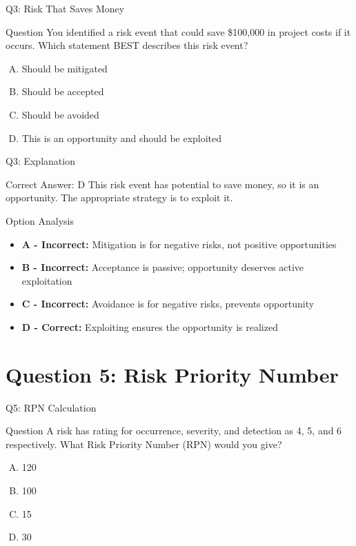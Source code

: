\documentclass{beamer}
\begin{document}
	\begin{frame}{Q3: Risk That Saves Money}
		\begin{block}{Question}
			You identified a risk event that could save \$100,000 in project costs if it occurs. Which statement BEST describes this risk event?
		\end{block}
		\begin{enumerate}[(A)]
			\item Should be mitigated
			\item Should be accepted
			\item Should be avoided
			\item This is an opportunity and should be exploited
		\end{enumerate}
	\end{frame}
	
	\begin{frame}{Q3: Explanation}
		\begin{block}{Correct Answer: D}
			This risk event has potential to save money, so it is an opportunity. The appropriate strategy is to exploit it.
		\end{block}
		\begin{block}{Option Analysis}
			\begin{itemize}
				\item \textbf{A - Incorrect:} Mitigation is for negative risks, not positive opportunities
				\item \textbf{B - Incorrect:} Acceptance is passive; opportunity deserves active exploitation
				\item \textbf{C - Incorrect:} Avoidance is for negative risks, prevents opportunity
				\item \textbf{D - Correct:} Exploiting ensures the opportunity is realized
			\end{itemize}
		\end{block}
	\end{frame}
	

	\section{Question 5: Risk Priority Number}
	
	\begin{frame}{Q5: RPN Calculation}
		\begin{block}{Question}
			A risk has rating for occurrence, severity, and detection as 4, 5, and 6 respectively. What Risk Priority Number (RPN) would you give?
		\end{block}
		\begin{enumerate}[(A)]
			\item 120
			\item 100
			\item 15
			\item 30
		\end{enumerate}
	\end{frame}
	
\end{document}

